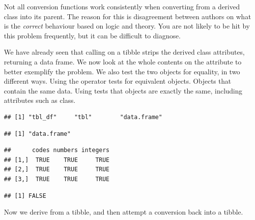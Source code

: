 \documentclass[krantz2]{krantz}\usepackage{knitr}%
\begin{document}
\begin{explainbox}
Not all conversion functions work consistently when converting from a derived class into its parent. The reason for this is disagreement between authors on what is the \emph{correct} behaviour based on logic and theory. You are not likely to be hit by this problem frequently, but it can be difficult to diagnose.

We have already seen that calling  on a tibble strips the derived class attributes, returning a data frame. We now look at the whole contents on the  attribute to better exemplify the problem. We also test the two objects for equality, in two different ways. Using the operator \code{==} tests for equivalent objects. Objects that contain the same data. Using  tests that objects are exactly the same, including attributes such as class.

\begin{knitrout}\footnotesize
{}\color{fgcolor}\begin{kframe}
\begin{alltt}
\end{alltt}
\begin{verbatim}
## [1] "tbl_df"     "tbl"        "data.frame"
\end{verbatim}
\begin{alltt}
\end{alltt}
\begin{verbatim}
## [1] "data.frame"
\end{verbatim}
\begin{alltt}
 \hlopt{==} 
\end{alltt}
\begin{verbatim}
##      codes numbers integers
## [1,]  TRUE    TRUE     TRUE
## [2,]  TRUE    TRUE     TRUE
## [3,]  TRUE    TRUE     TRUE
\end{verbatim}
\begin{alltt}
\end{alltt}
\begin{verbatim}
## [1] FALSE
\end{verbatim}
\end{kframe}
\end{knitrout}

Now we derive from a tibble, and then attempt a conversion back into a tibble.


\end{explainbox}
\end{document}
